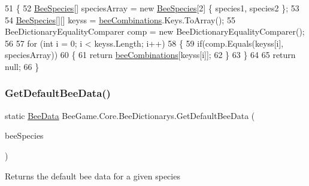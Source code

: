 \begin{DoxyCode}
51         \{
52             \hyperlink{namespace_bee_game_1_1_enums_aa2ead984825678d83c42d48f6382619c}{BeeSpecies}[] speciesArray = \textcolor{keyword}{new} \hyperlink{namespace_bee_game_1_1_enums_aa2ead984825678d83c42d48f6382619c}{BeeSpecies}[2] \{ species1, species2 \};
53 
54             \hyperlink{namespace_bee_game_1_1_enums_aa2ead984825678d83c42d48f6382619c}{BeeSpecies}[][] keyss = \hyperlink{class_bee_game_1_1_core_1_1_bee_dictionarys_a1ebc1dfba158d134ff8b28082c9a2cb2}{beeCombinations}.Keys.ToArray();
55             BeeDictionaryEqualityComparer comp = \textcolor{keyword}{new} BeeDictionaryEqualityComparer();
56 
57             \textcolor{keywordflow}{for} (\textcolor{keywordtype}{int} i = 0; i < keyss.Length; i++)
58             \{
59                 \textcolor{keywordflow}{if}(comp.Equals(keyss[i], speciesArray))
60                 \{
61                     \textcolor{keywordflow}{return} \hyperlink{class_bee_game_1_1_core_1_1_bee_dictionarys_a1ebc1dfba158d134ff8b28082c9a2cb2}{beeCombinations}[keyss[i]];
62                 \}
63             \}
64 
65             \textcolor{keywordflow}{return} null;
66         \}
\end{DoxyCode}
\mbox{\label{class_bee_game_1_1_core_1_1_bee_dictionarys_acc616a791a2b14382dbff21433551596}} 
\subsubsection{\texorpdfstring{Get\+Default\+Bee\+Data()}{GetDefaultBeeData()}}
{\footnotesize\ttfamily static \hyperlink{struct_bee_game_1_1_bee_1_1_bee_data}{Bee\+Data} Bee\+Game.\+Core.\+Bee\+Dictionarys.\+Get\+Default\+Bee\+Data (\begin{DoxyParamCaption}\item[{\hyperlink{namespace_bee_game_1_1_enums_aa2ead984825678d83c42d48f6382619c}{Bee\+Species}}]{bee\+Species }\end{DoxyParamCaption})\hspace{0.3cm}{\ttfamily [static]}}



Returns the default bee data for a given species 


